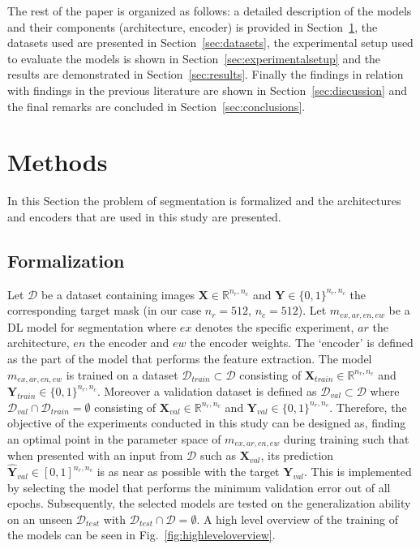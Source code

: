 \documentclass{elsarticle}
\begin{document}
The rest of the paper is organized as follows: a detailed description
of the models and their components (architecture, encoder) is
provided in Section~\ref{sec:methods}, the datasets used are
presented in Section~\ref{sec:datasets}, the experimental setup used
to evaluate the models is shown in
Section~\ref{sec:experimentalsetup} and the results are demonstrated
in Section~\ref{sec:results}. Finally the findings in relation with
findings in the previous literature are shown in
Section~\ref{sec:discussion} and the final remarks are concluded in
Section~\ref{sec:conclusions}.

\section{Methods}\label{sec:methods}
In this Section the problem of segmentation is formalized and the
architectures and encoders that are used in this study are presented.

\subsection{Formalization}
Let $\mathcal{D}$ be a dataset containing images $\bm{X} \in
\mathbb{R}^{n_r, n_c}$ and $\bm{Y} \in \{0, 1\}^{n_r, n_c}$ the
corresponding target mask (in our case $n_r=512$, $n_c=512$).
Let $m_{ex, ar, en, ew}$ be a DL model for segmentation where $ex$
denotes the specific experiment, $ar$ the architecture, $en$ the
encoder and $ew$ the encoder weights.
The `encoder' is defined as the part of the model that performs the
feature extraction.
The model $m_{ex, ar, en, ew}$ is trained on a dataset
$\mathcal{D}_{train}\subset\mathcal{D}$ consisting of $\bm{X}_{train}
\in \mathbb{R}^{n_r, n_c}$ and $\bm{Y}_{train} \in \{0, 1\}^{n_r,
n_c}$.
Moreover a validation dataset is defined as
$\mathcal{D}_{val}\subset\mathcal{D}$ where
$\mathcal{D}_{val}\cap\mathcal{D}_{train}=\emptyset$ consisting of
$\bm{X}_{val} \in \mathbb{R}^{n_r, n_c}$ and $\bm{Y}_{val} \in \{0,
1\}^{n_r, n_c}$.
Therefore, the objective of the experiments conducted in this study
can be designed as, finding an optimal point in the parameter space
of $m_{ex, ar, en, ew}$ during training such that when presented with
an input from $\mathcal{D}$ such as $\bm{X}_{val}$, its prediction
$\hat{\bm{Y}}_{val} \in [0, 1]^{n_r, n_c}$ is as near as possible
with the target $\bm{Y}_{val}$.
This is implemented by selecting the model that performs the minimum
validation error out of all epochs.
Subsequently, the selected models are tested on the generalization
ability on an unseen $\mathcal{D}_{test}$ with
$\mathcal{D}_{test}\cap\mathcal{D}=\emptyset$.
A high level overview of the training of the models can be seen in
Fig.~\ref{fig:highleveloverview}.
\end{document}
